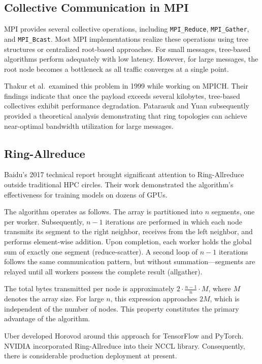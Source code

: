 \documentclass[12pt,a4paper]{article}
\begin{document}
\subsection{Collective Communication in MPI}

MPI provides several collective operations, including \texttt{MPI\_Reduce}, \texttt{MPI\_Gather}, and \texttt{MPI\_Bcast}. Most MPI implementations realize these operations using tree structures or centralized root-based approaches. For small messages, tree-based algorithms perform adequately with low latency. However, for large messages, the root node becomes a bottleneck as all traffic converges at a single point.

Thakur et al.\ examined this problem in 1999 while working on MPICH. Their findings indicate that once the payload exceeds several kilobytes, tree-based collectives exhibit performance degradation. Patarasuk and Yuan subsequently provided a theoretical analysis demonstrating that ring topologies can achieve near-optimal bandwidth utilization for large messages.

\subsection{Ring-Allreduce}

Baidu's 2017 technical report brought significant attention to Ring-Allreduce outside traditional HPC circles. Their work demonstrated the algorithm's effectiveness for training models on dozens of GPUs.

The algorithm operates as follows. The array is partitioned into $n$ segments, one per worker. Subsequently, $n-1$ iterations are performed in which each node transmits its segment to the right neighbor, receives from the left neighbor, and performs element-wise addition. Upon completion, each worker holds the global sum of exactly one segment (reduce-scatter). A second loop of $n-1$ iterations follows the same communication pattern, but without summation---segments are relayed until all workers possess the complete result (allgather).

The total bytes transmitted per node is approximately $2 \cdot \frac{n-1}{n} \cdot M$, where $M$ denotes the array size. For large $n$, this expression approaches $2M$, which is independent of the number of nodes. This property constitutes the primary advantage of the algorithm.

Uber developed Horovod around this approach for TensorFlow and PyTorch. NVIDIA incorporated Ring-Allreduce into their NCCL library. Consequently, there is considerable production deployment at present.
\end{document}
